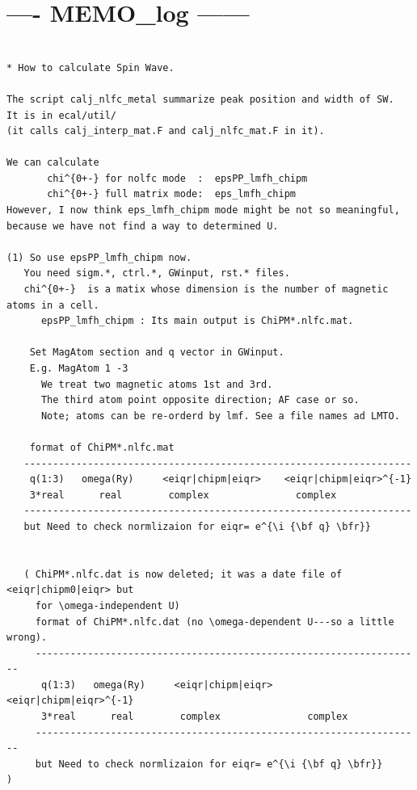 \documentclass[a4paper,10pt,epsf,fleqn]{article}
\newcommand{\bfr}{{\bf r}}
\newcommand{\figp}[1]{\rotatebox{-90}{\texttt{[image: \#1]}}}
\begin{document}


%


\newpage
\section{---- MEMO\_log ------}
\begin{verbatim}

* How to calculate Spin Wave.

The script calj_nlfc_metal summarize peak position and width of SW.
It is in ecal/util/
(it calls calj_interp_mat.F and calj_nlfc_mat.F in it).

We can calculate 
       chi^{0+-} for nolfc mode  :  epsPP_lmfh_chipm
       chi^{0+-} full matrix mode:  eps_lmfh_chipm
However, I now think eps_lmfh_chipm mode might be not so meaningful, 
because we have not find a way to determined U.

(1) So use epsPP_lmfh_chipm now. 
   You need sigm.*, ctrl.*, GWinput, rst.* files.
   chi^{0+-}  is a matix whose dimension is the number of magnetic atoms in a cell.
      epsPP_lmfh_chipm : Its main output is ChiPM*.nlfc.mat.

    Set MagAtom section and q vector in GWinput.
    E.g. MagAtom 1 -3 
      We treat two magnetic atoms 1st and 3rd.
      The third atom point opposite direction; AF case or so.
      Note; atoms can be re-orderd by lmf. See a file names ad LMTO.

    format of ChiPM*.nlfc.mat
   -------------------------------------------------------------------
    q(1:3)   omega(Ry)     <eiqr|chipm|eiqr>    <eiqr|chipm|eiqr>^{-1}
    3*real      real        complex               complex
   -------------------------------------------------------------------
   but Need to check normlizaion for eiqr= e^{\i {\bf q} \bfr}}


   ( ChiPM*.nlfc.dat is now deleted; it was a date file of <eiqr|chipm0|eiqr> but 
     for \omega-independent U)
     format of ChiPM*.nlfc.dat (no \omega-dependent U---so a little wrong).
     -------------------------------------------------------------------
      q(1:3)   omega(Ry)     <eiqr|chipm|eiqr>    <eiqr|chipm|eiqr>^{-1}
      3*real      real        complex               complex
     -------------------------------------------------------------------
     but Need to check normlizaion for eiqr= e^{\i {\bf q} \bfr}}         )



\end{verbatim}
\end{document}
